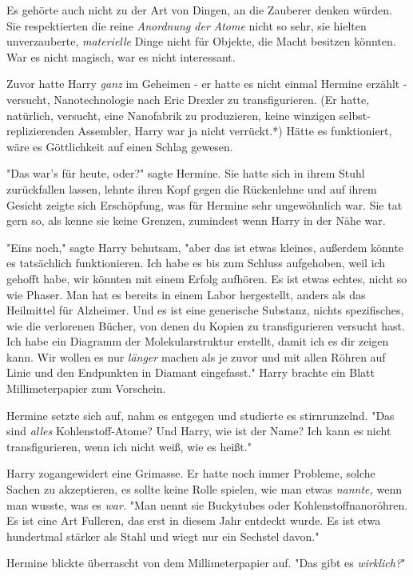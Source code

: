 {Es gehörte auch nicht zu der Art von Dingen, an die Zauberer denken würden. Sie respektierten die reine \emph{Anordnung der} \emph{Atome} nicht so sehr, sie hielten unverzauberte, \emph{materielle} Dinge nicht für Objekte, die Macht besitzen könnten. War es nicht magisch, war es nicht interessant.

Zuvor hatte Harry \emph{ganz} im Geheimen - er hatte es nicht einmal Hermine erzählt - versucht, Nanotechnologie nach Eric Drexler zu transfigurieren. (Er hatte, natürlich, versucht, eine Nanofabrik zu produzieren, keine winzigen selbst-replizierenden Assembler, Harry war ja nicht verrückt.*) Hätte es funktioniert, wäre es Göttlichkeit auf einen Schlag gewesen.

"Das war's für heute, oder?" sagte Hermine. Sie hatte sich in ihrem Stuhl zurückfallen lassen, lehnte ihren Kopf gegen die Rückenlehne und auf ihrem Gesicht zeigte sich Erschöpfung, was für Hermine sehr ungewöhnlich war. Sie tat gern so, als kenne sie keine Grenzen, zumindest wenn Harry in der Nähe war.

"Eins noch," sagte Harry behutsam, "aber das ist etwas kleines, außerdem könnte es tatsächlich funktionieren. Ich habe es bis zum Schluss aufgehoben, weil ich gehofft habe, wir könnten mit einem Erfolg aufhören. Es ist etwas echtes, nicht so wie Phaser. Man hat es bereits in einem Labor hergestellt, anders als das Heilmittel für Alzheimer. Und es ist eine generische Substanz, nichts spezifisches, wie die verlorenen Bücher, von denen du Kopien zu transfigurieren versucht hast. Ich habe ein Diagramm der Molekularstruktur erstellt, damit ich es dir zeigen kann. Wir wollen es nur \emph{länger} machen als je zuvor und mit allen Röhren auf Linie und den Endpunkten in Diamant eingefasst." Harry brachte ein Blatt Millimeterpapier zum Vorschein.

Hermine setzte sich auf, nahm es entgegen und studierte es stirnrunzelnd. "Das sind \emph{alles} Kohlenstoff-Atome? Und Harry, wie ist der Name? Ich kann es nicht transfigurieren, wenn ich nicht weiß, wie es heißt."

Harry zogangewidert eine Grimasse. Er hatte noch immer Probleme, solche Sachen zu akzeptieren, es sollte keine Rolle spielen, wie man etwas \emph{nannte,} wenn man wusste, was es \emph{war.} "Man nennt sie Buckytubes oder Kohlenstoffnanoröhren. Es ist eine Art Fulleren, das erst in diesem Jahr entdeckt wurde. Es ist etwa hundertmal stärker als Stahl und wiegt nur ein Sechstel davon."

Hermine blickte überrascht von dem Millimeterpapier auf. "Das gibt es \emph{wirklich?}"

}

